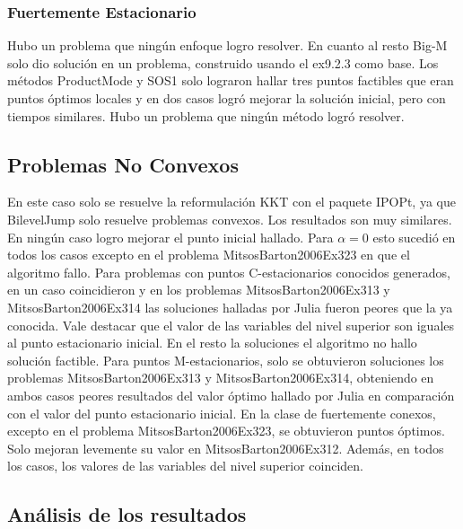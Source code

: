 \subsubsection{Fuertemente Estacionario} 
Hubo un problema que ningún enfoque logro resolver. En cuanto al resto  Big-M solo dio solución en un problema, construido usando el ex9.2.3 como base. Los métodos ProductMode y SOS1 solo lograron hallar tres puntos factibles que eran puntos óptimos locales y en dos casos logró mejorar la solución inicial, pero con tiempos similares. Hubo un problema que ningún método logró resolver.


\subsection{Problemas No Convexos}

En este caso solo se resuelve  la reformulación KKT con el paquete IPOPt, ya que BilevelJump solo resuelve problemas convexos. Los resultados son muy similares. En ningún caso logro mejorar el punto inicial hallado. Para $\alpha =0$ esto sucedió en todos los casos excepto en el problema MitsosBarton2006Ex323 en que el algoritmo fallo. Para  problemas con puntos C-estacionarios conocidos generados,  en un caso coincidieron y en  los problemas MitsosBarton2006Ex313 y MitsosBarton2006Ex314 las soluciones halladas por Julia fueron peores que la ya conocida. Vale destacar que el valor de las variables del nivel superior son iguales al punto estacionario inicial. En el resto la soluciones el algoritmo no hallo solución factible.   Para puntos M-estacionarios, solo se obtuvieron soluciones los problemas MitsosBarton2006Ex313 y MitsosBarton2006Ex314, obteniendo en ambos casos peores resultados del valor óptimo hallado por Julia en comparación con el valor del punto estacionario inicial. En la clase de fuertemente conexos, excepto en el problema MitsosBarton2006Ex323,
 se obtuvieron puntos óptimos. Solo mejoran levemente su valor en MitsosBarton2006Ex312. 
 Además, en todos los casos, los valores de las variables del nivel superior coinciden.
     

    




  


\subsection{Análisis de los resultados}


